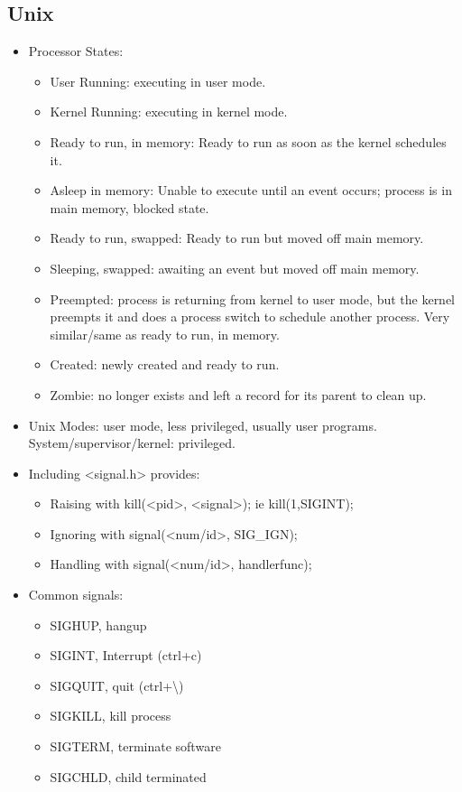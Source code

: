 \documentclass[fontsize=5pt]{scrartcl}
\begin{document}
\begin{multicols}{3}
    \section{Unix}
      \begin{itemize}
       \item Processor States:
        \begin{itemize}
         \item User Running: executing in user mode.
         \item Kernel Running: executing in kernel mode.
         \item Ready to run, in memory: Ready to run as soon as the kernel schedules it.
         \item Asleep in memory: Unable to execute until an event occurs; process is in main memory, blocked state.
         \item Ready to run, swapped: Ready to run but moved off main memory.
         \item Sleeping, swapped: awaiting an event but moved off main memory.
         \item Preempted: process is returning from kernel to user mode, but the kernel preempts it and does a process switch
               to schedule another process. Very similar/same as ready to run, in memory.
         \item Created: newly created and ready to run.
         \item Zombie: no longer exists and left a record for its parent to clean up.
        \end{itemize}
        \item Unix Modes: user mode, less privileged, usually user programs. System/supervisor/kernel: privileged.
        \item Including <signal.h> provides:
        \begin{itemize}
          \item Raising with kill(<pid>, <signal>); ie kill(1,SIGINT);
          \item Ignoring with signal(<num/id>, SIG\_IGN);
          \item Handling with signal(<num/id>, handlerfunc);
        \end{itemize}
        \item Common signals:
        \begin{itemize}
          \item SIGHUP, hangup
          \item SIGINT, Interrupt (ctrl+c)
          \item SIGQUIT, quit (ctrl+\textbackslash)
          \item SIGKILL, kill process
          \item SIGTERM, terminate software
          \item SIGCHLD, child terminated
        \end{itemize}


\end{itemize}
\end{multicols}
\end{document}
